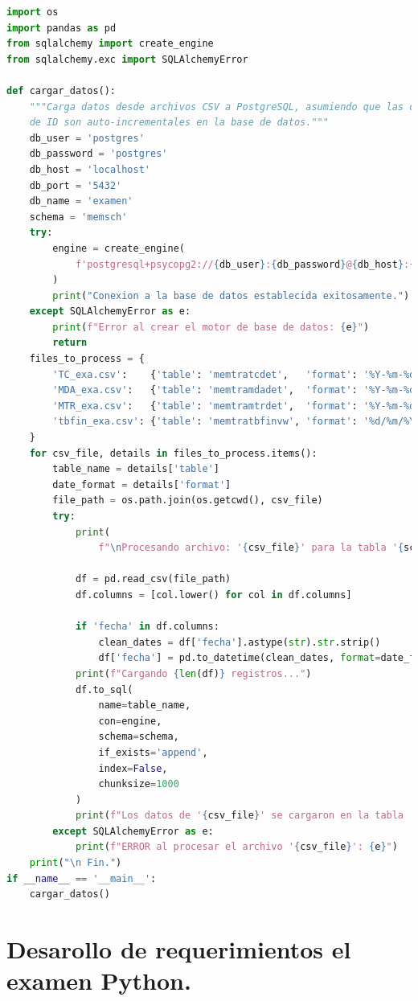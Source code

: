 \documentclass[11pt, a4paper]{article}
\begin{document}
\begin{lstlisting}[language=Python]
import os
import pandas as pd
from sqlalchemy import create_engine
from sqlalchemy.exc import SQLAlchemyError

def cargar_datos():
    """Carga datos desde archivos CSV a PostgreSQL, asumiendo que las columnas
    de ID son auto-incrementales en la base de datos."""
    db_user = 'postgres'
    db_password = 'postgres'
    db_host = 'localhost'
    db_port = '5432'
    db_name = 'examen'
    schema = 'memsch'
    try:
        engine = create_engine(
            f'postgresql+psycopg2://{db_user}:{db_password}@{db_host}:{db_port}/{db_name}'
        )
        print("Conexion a la base de datos establecida exitosamente.")
    except SQLAlchemyError as e:
        print(f"Error al crear el motor de base de datos: {e}")
        return
    files_to_process = {
        'TC_exa.csv':    {'table': 'memtratcdet',   'format': '%Y-%m-%d'},
        'MDA_exa.csv':   {'table': 'memtramdadet',  'format': '%Y-%m-%d'},
        'MTR_exa.csv':   {'table': 'memtramtrdet',  'format': '%Y-%m-%d'},
        'tbfin_exa.csv': {'table': 'memtratbfinvw', 'format': '%d/%m/%Y'}
    }
    for csv_file, details in files_to_process.items():
        table_name = details['table']
        date_format = details['format']
        file_path = os.path.join(os.getcwd(), csv_file)
        try:
            print(
                f"\nProcesando archivo: '{csv_file}' para la tabla '{schema}.{table_name}'")

            df = pd.read_csv(file_path)
            df.columns = [col.lower() for col in df.columns]

            if 'fecha' in df.columns:
                clean_dates = df['fecha'].astype(str).str.strip()
                df['fecha'] = pd.to_datetime(clean_dates, format=date_format)
            print(f"Cargando {len(df)} registros...")
            df.to_sql(
                name=table_name,
                con=engine,
                schema=schema,
                if_exists='append',
                index=False,
                chunksize=1000
            )
            print(f"Los datos de '{csv_file}' se cargaron en la tabla '{schema}.{table_name}'.")
        except SQLAlchemyError as e:
            print(f"ERROR al procesar el archivo '{csv_file}': {e}")
    print("\n Fin.")
if __name__ == '__main__':
    cargar_datos()
\end{lstlisting}

\newpage
\section{Desarollo de requerimientos el examen Python.}
\end{document}
